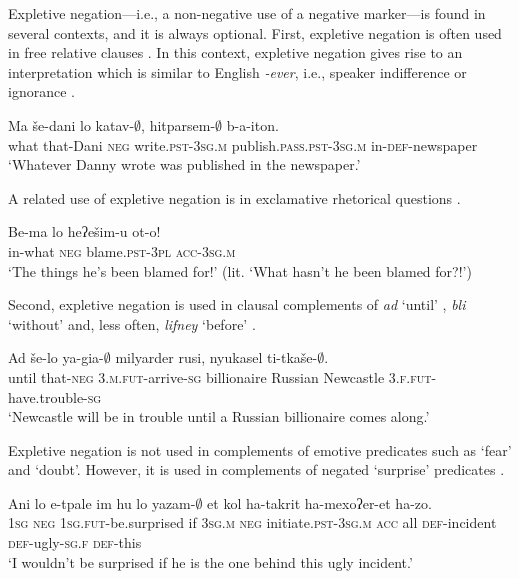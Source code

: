 \documentclass[output=paper,colorlinks,citecolor=brown]{langscibook}
\begin{document}
Expletive negation—i.e., a non-negative use of a negative marker—is found in several contexts, and it is always optional. First, expletive negation is often used in free relative clauses . In this context, expletive negation gives rise to an interpretation which is similar to English \textit{{}-ever}, i.e., speaker indifference or ignorance \citep[41]{Eilam2007}.

\ea\label{ex:heb:48}
    \gll Ma še-dani lo katav-${\emptyset}$, hitparsem-${\emptyset}$ b-a-iton. \\
        what that-Dani \textsc{neg} write.\textsc{pst}{}-3\textsc{sg.m} publish.\textsc{pass.pst-}3\textsc{sg.m} in-\textsc{def}{}-newspaper\\
    \glt ‘Whatever Danny wrote was published in the newspaper.’ \citep[41]{Eilam2007}
\z 

A related use of expletive negation is in exclamative rhetorical questions \citep[167]{RubinsteinEtAl2015}.

\ea\label{ex:heb:49}
    \gll Be-ma lo heʔešim-u ot-o!\\
        in-what \textsc{neg} blame.\textsc{pst}{}-3\textsc{pl} \textsc{acc-3sg.m}\\
    \glt ‘The things he’s been blamed for!’ (lit. ‘What hasn't he been blamed for?!') \citep[167]{RubinsteinEtAl2015}
\z 

Second, expletive negation is used in clausal complements of \textit{ad} ‘until’ , \textit{bli} ‘without’ and, less often, \textit{lifney} ‘before’ \citep[168]{RubinsteinEtAl2015}.

\ea\label{ex:heb:50}
    \gll Ad še-lo ya-gia-${\emptyset}$ milyarder rusi, nyukasel ti-tkaše-${\emptyset}$. \\
        until that-\textsc{neg} \textsc{3.m.fut-}arrive{}-\textsc{sg} billionaire Russian Newcastle 3\textsc{.f.fut}{}-have.trouble-\textsc{sg}\\
    \glt ‘Newcastle will be in trouble until a Russian billionaire comes along.’ \citep[168]{RubinsteinEtAl2015}
\z 

Expletive negation is not used in complements of emotive predicates such as ‘fear’ and ‘doubt’. However, it is used in complements of negated ‘surprise’ predicates \citep[169]{RubinsteinEtAl2015}.

\ea\label{ex:heb:51}
    \gll Ani lo e-tpale im hu lo yazam-${\emptyset}$ et kol ha-takrit ha-mexoʔer-et ha-zo.\\
        1\textsc{sg} \textsc{neg} 1\textsc{sg.fut}{}-be.surprised if 3\textsc{sg.m} \textsc{neg} initiate.\textsc{pst-3sg.m} \textsc{acc} all \textsc{def}{}-incident \textsc{def}{}-ugly-\textsc{sg.f} \textsc{def}{}-this\\
    \glt ‘I wouldn’t be surprised if he is the one behind this ugly incident.’ \citep[169]{RubinsteinEtAl2015} 
\z 
\end{document}
